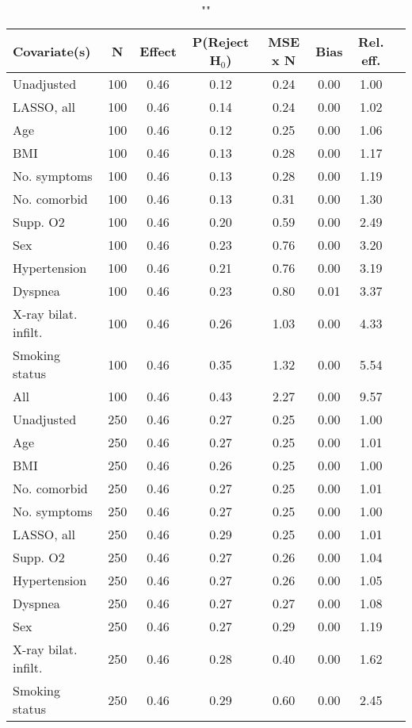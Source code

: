 \documentclass{article}
\begin{document}
{\tabcolsep=6pt  %
\begin{longtable}{lccccccc}
\caption{""} \\
Covariate(s) & N & Effect & P(Reject H$_0$) & MSE x N & Bias & Rel. eff.\\ \midrule
Unadjusted & 100 & 0.46 & 0.12 & 0.24 & 0.00 & 1.00 \\ 
LASSO, all & 100 & 0.46 & 0.14 & 0.24 & 0.00 & 1.02 \\ 
Age & 100 & 0.46 & 0.12 & 0.25 & 0.00 & 1.06 \\ 
BMI & 100 & 0.46 & 0.13 & 0.28 & 0.00 & 1.17 \\ 
No. symptoms & 100 & 0.46 & 0.13 & 0.28 & 0.00 & 1.19 \\ 
No. comorbid & 100 & 0.46 & 0.13 & 0.31 & 0.00 & 1.30 \\ 
Supp. O2 & 100 & 0.46 & 0.20 & 0.59 & 0.00 & 2.49 \\ 
Sex & 100 & 0.46 & 0.23 & 0.76 & 0.00 & 3.20 \\ 
Hypertension & 100 & 0.46 & 0.21 & 0.76 & 0.00 & 3.19 \\ 
Dyspnea & 100 & 0.46 & 0.23 & 0.80 & 0.01 & 3.37 \\ 
X-ray bilat. infilt. & 100 & 0.46 & 0.26 & 1.03 & 0.00 & 4.33 \\ 
Smoking status & 100 & 0.46 & 0.35 & 1.32 & 0.00 & 5.54 \\ 
All & 100 & 0.46 & 0.43 & 2.27 & 0.00 & 9.57 \\ \midrule 
Unadjusted & 250 & 0.46 & 0.27 & 0.25 & 0.00 & 1.00 \\ 
Age & 250 & 0.46 & 0.27 & 0.25 & 0.00 & 1.01 \\ 
BMI & 250 & 0.46 & 0.26 & 0.25 & 0.00 & 1.00 \\ 
No. comorbid & 250 & 0.46 & 0.27 & 0.25 & 0.00 & 1.01 \\ 
No. symptoms & 250 & 0.46 & 0.27 & 0.25 & 0.00 & 1.00 \\ 
LASSO, all & 250 & 0.46 & 0.29 & 0.25 & 0.00 & 1.01 \\ 
Supp. O2 & 250 & 0.46 & 0.27 & 0.26 & 0.00 & 1.04 \\ 
Hypertension & 250 & 0.46 & 0.27 & 0.26 & 0.00 & 1.05 \\ 
Dyspnea & 250 & 0.46 & 0.27 & 0.27 & 0.00 & 1.08 \\ 
Sex & 250 & 0.46 & 0.27 & 0.29 & 0.00 & 1.19 \\ 
X-ray bilat. infilt. & 250 & 0.46 & 0.28 & 0.40 & 0.00 & 1.62 \\ 
Smoking status & 250 & 0.46 & 0.29 & 0.60 & 0.00 & 2.45 \\ 

\end{longtable}}
\end{document}

